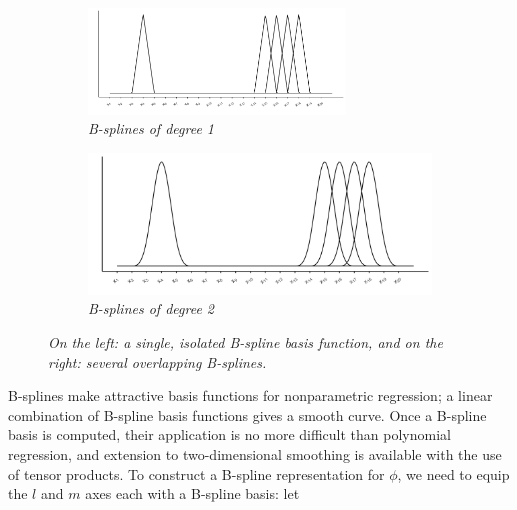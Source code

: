 \begin{figure}[H]
 \begin{center}
 \begin{subfigure}[t]{\textwidth}
  \centering
   \includegraphics[width=0.75\textwidth]{img/uni_linear_bsplines}
 \caption{\textit{B-splines of degree 1} }\label{fig:overlapping-linear-bsplines}
  \end{subfigure}
   \end{center}
  \hfill
  \begin{center}
 \begin{subfigure}[t]{0.75\textwidth}
\includegraphics[width = \textwidth]{img/uni_cubic_bsplines}
 \caption{\textit{B-splines of degree 2}}
\label{fig:overlapping-cubic-bsplines}
 \end{subfigure}
 \end{center}
   \caption{\textit{ On the left: a single, isolated B-spline basis function, and on the right: several overlapping B-splines.  }}\label{fig:overlapping-linear-cubic-bsplines}
\end{figure}

B-splines make attractive basis functions for nonparametric regression; a linear combination of B-spline basis functions gives a smooth curve. Once a B-spline basis is computed, their application is no more difficult than polynomial regression, and extension to two-dimensional smoothing is available with the use of tensor products. To construct a B-spline representation for $\phi$, we need to equip the $l$ and $m$ axes each with a B-spline basis: let


